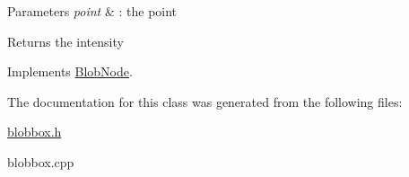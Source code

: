 \begin{DoxyParams}{Parameters}
{\em point} & : the point \\
\hline
\end{DoxyParams}
\begin{DoxyReturn}{Returns}
the intensity 
\end{DoxyReturn}


Implements \hyperlink{class_blob_node_a4987f9060e9141647c514efd9859d0ba}{BlobNode}.



The documentation for this class was generated from the following files:\begin{DoxyCompactItemize}
\item 
\hyperlink{blobbox_8h}{blobbox.h}\item 
blobbox.cpp\end{DoxyCompactItemize}
